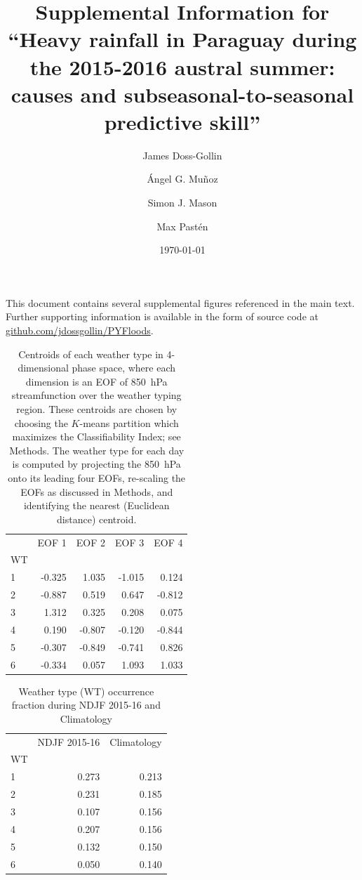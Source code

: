 \documentclass{article}
\title{Supplemental Information for\\``Heavy rainfall in Paraguay during the 2015-2016 austral summer: causes and subseasonal-to-seasonal predictive skill''}
\author{James Doss-Gollin\and \'{A}ngel G. Mu\~{n}oz  \and Simon J. Mason \and Max Past\'{e}n }
\date{\today}
\begin{document}
\maketitle

This document contains several supplemental figures referenced in the main text.
Further supporting information is available in the form of source code at \url{github.com/jdossgollin/PYFloods}.

\listoftables
\listoffigures

\clearpage

\begin{table}
	\centering
	\begin{tabular}{lrrrr}
		\toprule
		{} &  EOF 1 &  EOF 2 &  EOF 3 &  EOF 4 \\
		WT &        &        &        &        \\
		\midrule
		1  & -0.325 &  1.035 & -1.015 &  0.124 \\
		2  & -0.887 &  0.519 &  0.647 & -0.812 \\
		3  &  1.312 &  0.325 &  0.208 &  0.075 \\
		4  &  0.190 & -0.807 & -0.120 & -0.844 \\
		5  & -0.307 & -0.849 & -0.741 &  0.826 \\
		6  & -0.334 &  0.057 &  1.093 &  1.033 \\
		\bottomrule
		\end{tabular}
	\caption{
		Centroids of each weather type in 4-dimensional phase space, where each dimension is an EOF of \SI{850}{\hecto\pascal} streamfunction over the weather typing region. 
		These centroids are chosen by choosing the $K$-means partition which maximizes the Classifiability Index; see Methods.
		The weather type for each day is computed by projecting the \SI{850}{\hecto\pascal} onto its leading four EOFs, re-scaling the EOFs as discussed in Methods, and identifying the nearest (Euclidean distance) centroid.
	}
\end{table}

\begin{table}
	\centering
	\begin{tabular}{lrr}
		\toprule
		{} &  NDJF 2015-16 &  Climatology \\
		WT &               &              \\
		\midrule
		1     &         0.273 &        0.213 \\
		2     &         0.231 &        0.185 \\
		3     &         0.107 &        0.156 \\
		4     &         0.207 &        0.156 \\
		5     &         0.132 &        0.150 \\
		6     &         0.050 &        0.140 \\
		\bottomrule
	\end{tabular}
	\caption{Weather type (WT) occurrence fraction during NDJF 2015-16 and Climatology}
\end{table}
\end{document}
